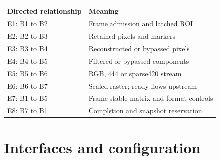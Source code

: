 \documentclass[11pt,a4paper]{article}
\begin{document}
{\small\renewcommand{\arraystretch}{1.18}\begin{longtable}{@{}L{0.24\textwidth}|L{0.7\textwidth}@{}}\toprule

\textbf{Directed relationship} & \textbf{Meaning}\\\midrule\endhead

E1: B1 to B2 & Frame admission and latched ROI\\[2pt]\hline

E2: B2 to B3 & Retained pixels and markers\\[2pt]\hline

E3: B3 to B4 & Reconstructed or bypassed pixels\\[2pt]\hline

E4: B4 to B5 & Filtered or bypassed components\\[2pt]\hline

E5: B5 to B6 & RGB,\allowbreak{} 444 or sparse42\allowbreak{}0 stream\\[2pt]\hline

E6: B6 to B7 & Scaled raster; ready flows upstream\\[2pt]\hline

E7: B1 to B5 & Frame-stable matrix and format controls\\[2pt]\hline

E8: B7 to B1 & Completion and snapshot reservation\\[2pt]\hline

\bottomrule\end{longtable}}

\section{Interfaces and configuration}
\end{document}
